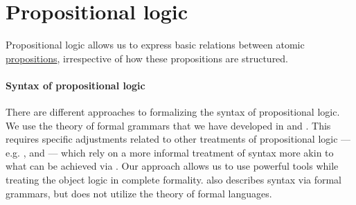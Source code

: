 \section{Propositional logic}\label{sec:propositional_logic}

Propositional logic allows us to express basic relations between atomic \hyperref[con:proposition]{propositions}, irrespective of how these propositions are structured.

\paragraph{Syntax of propositional logic}

There are different approaches to formalizing the syntax of propositional logic. We use the theory of formal grammars that we have developed in  and . This requires specific adjustments related to other treatments of propositional logic --- e.g. ,  and  --- which rely on a more informal treatment of syntax more akin to what can be achieved via . Our approach allows us to use powerful tools while treating the object logic in complete formality.  also describes syntax via formal grammars, but does not utilize the theory of formal languages.

